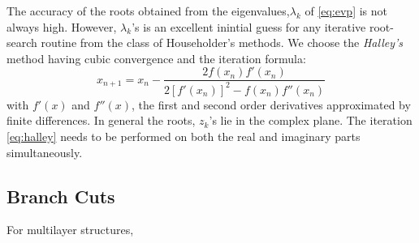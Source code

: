 \documentclass[12pt]{article}
\begin{document}
The accuracy of the roots obtained from the eigenvalues,$\lambda_k$ of \eqref{eq:evp} is not always high. However, $\lambda_k$'s is an excellent inintial guess for any iterative root-search routine from the class of Householder's methods. We choose the \emph{Halley's} method having cubic convergence and the iteration formula:
%
\begin{equation}
  x_{n+1} = x_n - \frac {2 f(x_n) f'(x_n)} {2 {[f'(x_n)]}^2 - f(x_n) f''(x_n)}
  \label{eq:halley}
\end{equation}
%
with $f'(x)$ and $f''(x)$, the first and second order derivatives approximated by finite differences. In general the roots, $z_k$'s lie in the complex plane. The iteration \eqref{eq:halley} needs to be performed on both the real and imaginary parts simultaneously.

\subsection{Branch Cuts}

For multilayer structures,









\clearpage %


\end{document}
